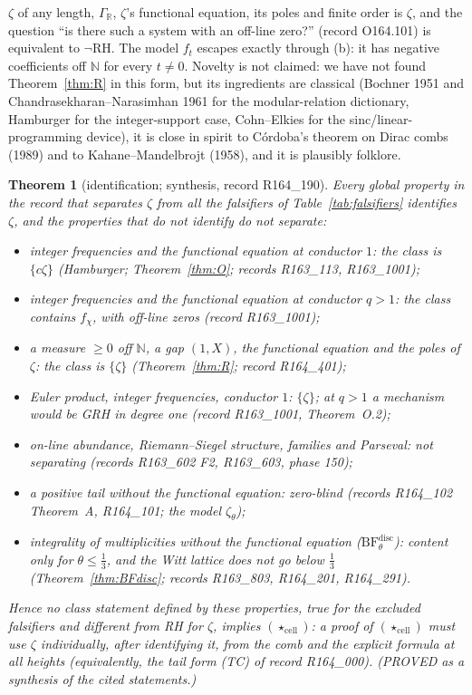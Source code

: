 \documentclass[11pt]{amsart}
\newtheorem{theorem}{Theorem}[section]
\theoremstyle{definition}
\theoremstyle{remark}
\newcommand{\N}{\mathbb N}
\begin{document}
$\zeta$ of any length, $\Gamma_{\mathbb R}$, $\zeta$'s functional equation, its poles and finite order is $\zeta$, and the
question ``is there such a system with an off-line zero?'' (record O164.101) is equivalent to $\neg$RH. The model $f_t$ escapes
exactly through (b): it has negative coefficients off $\N$ for every $t\ne0$. Novelty is not claimed: we have not found
Theorem~\ref{thm:R} in this form, but its ingredients are classical (Bochner 1951 and Chandrasekharan--Narasimhan 1961 for the
modular-relation dictionary, Hamburger for the integer-support case, Cohn--Elkies for the sinc/linear-programming device), it is
close in spirit to C\'ordoba's theorem on Dirac combs (1989) and to Kahane--Mandelbrojt (1958), and it is plausibly folklore.

\begin{theorem}[identification; synthesis, record R164\_190]\label{thm:ident}
Every global property in the record that separates $\zeta$ from all the falsifiers of Table~\ref{tab:falsifiers} identifies
$\zeta$, and the properties that do not identify do not separate:
\begin{itemize}
\item integer frequencies and the functional equation at conductor $1$: the class is $\{c\zeta\}$ (Hamburger; Theorem~\ref{thm:O}; records R163\_113, R163\_1001);
\item integer frequencies and the functional equation at conductor $q>1$: the class contains $f_\chi$, with off-line zeros (record R163\_1001);
\item a measure $\ge0$ off $\N$, a gap $(1,X)$, the functional equation and the poles of $\zeta$: the class is $\{\zeta\}$ (Theorem~\ref{thm:R}; record R164\_401);
\item Euler product, integer frequencies, conductor $1$: $\{\zeta\}$; at $q>1$ a mechanism would be GRH in degree one (record R163\_1001, Theorem~O.2);
\item on-line abundance, Riemann--Siegel structure, families and Parseval: not separating (records R163\_602 F2, R163\_603, phase 150);
\item a positive tail without the functional equation: zero-blind (records R164\_102 Theorem~A, R164\_101; the model $\zeta_\theta$);
\item integrality of multiplicities without the functional equation ($\mathrm{BF}^{\mathrm{disc}}_\theta$): content only for $\theta\le\frac13$, and the Witt lattice does not go below $\frac13$ (Theorem~\ref{thm:BFdisc}; records R163\_803, R164\_201, R164\_291).
\end{itemize}
Hence no class statement defined by these properties, true for the excluded falsifiers and different from RH for $\zeta$,
implies $(\star_{\mathrm{cell}})$: a proof of $(\star_{\mathrm{cell}})$ must use $\zeta$ individually, after identifying it, from the
comb and the explicit formula at all heights (equivalently, the tail form (TC) of record R164\_000). (PROVED as a synthesis of the
cited statements.)
\end{theorem}
\end{document}
